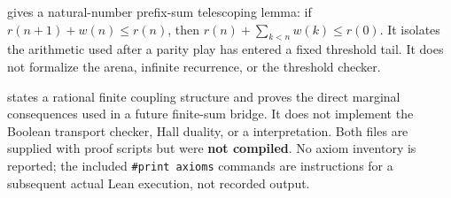  gives a natural-number prefix-sum telescoping lemma:
if $r(n+1)+w(n)\le r(n)$, then
$r(n)+\sum_{k<n}w(k)\le r(0)$. It isolates the arithmetic used after a parity
play has entered a fixed threshold tail. It does not formalize the arena,
infinite recurrence, or the threshold checker.

 states a rational finite coupling structure and
proves the direct marginal consequences used in a future finite-sum bridge.
It does not implement the Boolean transport checker, Hall duality, or a
 interpretation. Both files are supplied with proof scripts but were
\textbf{not compiled}. No axiom inventory is reported; the included
\texttt{\#print axioms} commands are instructions for a subsequent actual Lean
execution, not recorded output.

